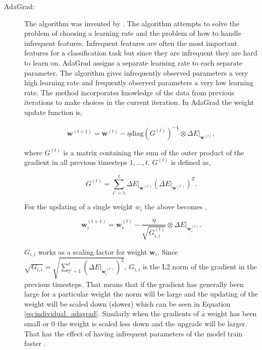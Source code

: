 \begin{description}

    \item[\gls{AdaGrad}:]

        The algorithm was invented by \citet{Duchi:2011:ASM:1953048.2021068}.
        The algorithm attempts to solve the problem of choosing a learning
        rate and the problem of how to handle infrequent features. Infrequent
        features are often the most important features for a classification task
        but since they are infrequent they are hard to learn on. \gls{AdaGrad}
        assigns a separate learning rate to each separate parameter. The
        algorithm gives infrequently observed parameters a very high learning
        rate and frequently observed parameters a very low learning rate. The
        method incorporates knowledge of the data from previous iterations to
        make choices in the current iteration. In \gls{AdaGrad} the weight
        update function is,

        \begin{equation}
            \mathbf{w}^{(t+1)} =
                \mathbf{w}^{(t)} -
                \eta \text{diag}\left(G^{(t)}\right)^{-\frac{1}{2}} \otimes
                \Delta E|_{\mathbf{w}^{(t)}},
        \end{equation}

        where $G^{(t)}$ is a matrix containing the sum of the outer product
        of the gradient in all previous timesteps $1, \dots, t$. $G^{(t)}$ is
        defined as,

        \begin{equation}
            G^{(t)} = \sum_{t'=1}^t \Delta E|_{\mathbf{w}^{(t')}}
                \left(
                    \Delta E|_{\mathbf{w}^{(t')}}
                \right)^T.
        \end{equation}

        For the updating of a single weight $w_i$ the above becomes
        \citep{Duchi:2011:ASM:1953048.2021068},

        \begin{equation}
            \label{eq:individual_adagrad}
            \mathbf{w}_i^{(t+1)} =
                \mathbf{w}_i^{(t)} - \frac{\eta}{\sqrt{G^{(t)}_{i,i}}} \otimes
                \Delta E|_{\mathbf{w}_i^{(t)}}.
        \end{equation}

        $G_{i,i}$ works as a scaling factor for weight $\mathbf{w}_i$.
        Since $\sqrt{G_{i,i}} = \sqrt{\sum_{t'=1}^t \left(\Delta
        E|_{\mathbf{w}^{(t')}_i}\right)^2}$, $G_{i,i}$ is the L2 norm
        of the gradient in the previous timesteps. That means that if the
        gradient has generally been large for a particular weight the norm
        will be large and the updating of the weight will be scaled down
        (slower) which can be seen in Equation \eqref{eq:individual_adagrad}.
        Similarly when the gradients of a weight has been small or 0 the
        weight is scaled less down and the upgrade will be larger. That has
        the effect of having infrequent parameters of the model train faster
        \citep{Duchi:2011:ASM:1953048.2021068}.


\end{description}
